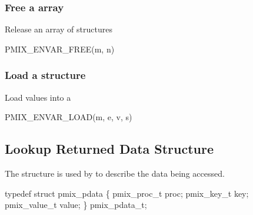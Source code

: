 \subsubsection{Free a array}

Release an array of  structures

\cspecificstart
\begin{codepar}
PMIX_ENVAR_FREE(m, n)
\end{codepar}
\cspecificend

\begin{arglist}
\end{arglist}

\subsubsection{Load a structure}

Load values into a 

\cspecificstart
\begin{codepar}
PMIX_ENVAR_LOAD(m, e, v, s)
\end{codepar}
\cspecificend

\begin{arglist}
\end{arglist}


\subsection{Lookup Returned Data Structure}

The  structure is used by  to describe the data being accessed.

\cspecificstart
\begin{codepar}
typedef struct pmix_pdata \{
    pmix_proc_t proc;
    pmix_key_t key;
    pmix_value_t value;
\} pmix_pdata_t;
\end{codepar}
\cspecificend

